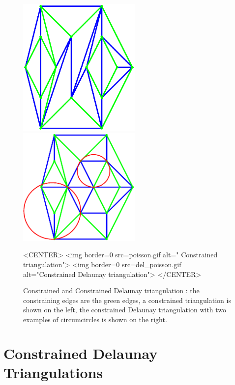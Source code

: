 \begin{figure}
\begin{ccTexOnly}
\begin{center}
\includegraphics[width=6cm]{poisson.ps}
\includegraphics[width=6cm]{del_poisson.ps}
\end{center}
\end{ccTexOnly}
\caption{Constrained and Constrained Delaunay triangulation : 
 the constraining edges are the green edges,  a constrained
triangulation is shown on the left, the constrained Delaunay
triangulation with two examples of circumcircles is shown on the right.}
\label{I1_Fig_constrained}
\begin{ccHtmlOnly}
<CENTER>
<img border=0 src=poisson.gif alt=" Constrained triangulation">
<img border=0 src=del_poisson.gif alt="Constrained Delaunay triangulation">
</CENTER>
\end{ccHtmlOnly}
\end{figure}


\section{Constrained Delaunay Triangulations}
\label{Section_2D_Triangulations_Constrained_Delaunay}


